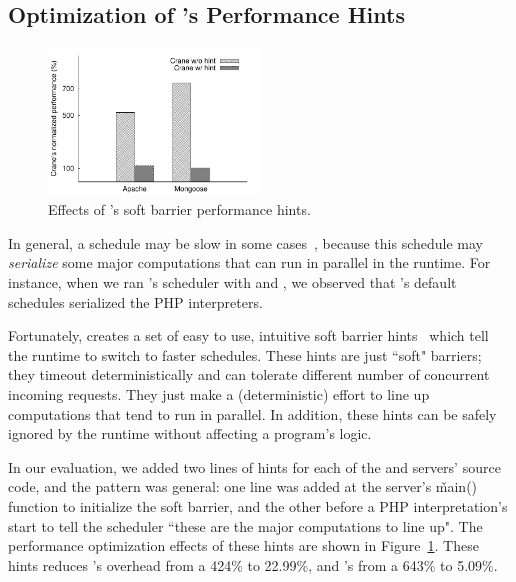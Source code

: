 \subsection{Optimization of \parrot's Performance Hints} \label{sec:hint}

\begin{figure}[t]
\centering
\includegraphics[width=0.5\textwidth]{figures/opt-hint}
\vspace{-.10in}
\caption{\small {Effects of \parrot's soft barrier performance hints.}}
\label{fig:opt-hint}
\end{figure}

In general, a \dmt schedule may be slow in some cases~\cite{parrot:sosp13, 
dthreads:sosp11}, because this schedule may \emph{serialize} some major 
computations that can run in parallel in the \pthread runtime. For instance, 
when we ran \xxx's \dmt scheduler \parrot with \apache and \mongoose, we 
observed that \parrot's default schedules serialized the PHP interpreters.

Fortunately, \parrot creates a set of easy to use, intuitive soft barrier 
hints~\cite{parrot:sosp13} which tell the \dmt runtime to switch to faster 
schedules. These hints are just ``soft" barriers; they timeout 
deterministically and can tolerate different number of concurrent incoming 
requests. They just make a (deterministic) effort to line up computations that 
tend to run in parallel. In addition, these hints can be safely ignored by the 
\parrot runtime without affecting a program's logic.

In our evaluation, we added two lines of hints for each of the \apache and 
\mongoose servers' source code, and the pattern was general: one line was 
added at the server's \v{main()} function to initialize the soft barrier, and 
the other before a PHP interpretation's start to tell the \dmt scheduler 
``these are the major computations to line up". The performance optimization 
effects of these hints are shown in Figure~\ref{fig:opt-hint}. These hints 
reduces \apache's overhead from a 424\% to 22.99\%, and \mongoose's from a 643\% 
to 5.09\%.




